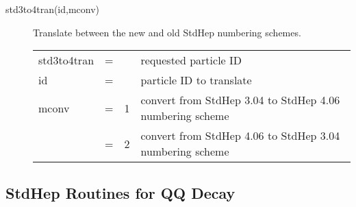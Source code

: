 \begin{description}
\item[std3to4tran(id,mconv)] Translate between the new and old StdHep numbering schemes.

\begin{tabular}{lcll}
std3to4tran & = &   & requested particle ID \\
id          & = &   & particle ID to translate \\
mconv       & = & 1 & convert from StdHep 3.04 to StdHep 4.06 numbering scheme \\
            & = & 2 & convert from StdHep 4.06 to StdHep 3.04 numbering scheme \\
\end{tabular}

\end{description}


\subsection{StdHep Routines for QQ Decay}

